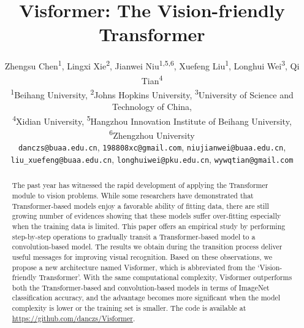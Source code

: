 \documentclass[10pt,twocolumn,letterpaper]{article}
\begin{document}
\title{Visformer: The Vision-friendly Transformer}

\author{Zhengsu Chen\textsuperscript{1}, Lingxi Xie\textsuperscript{2}, Jianwei Niu\textsuperscript{1,5,6}, Xuefeng Liu\textsuperscript{1}, Longhui Wei\textsuperscript{3}, Qi Tian\textsuperscript{4}\\
\textsuperscript{1}Beihang University, \textsuperscript{2}Johns Hopkins University, \textsuperscript{3}University of Science and Technology of China,\\ 
\textsuperscript{4}Xidian University,
\textsuperscript{5}Hangzhou Innovation Institute of Beihang University, 
\textsuperscript{6}Zhengzhou University\\
{\tt\small danczs@buaa.edu.cn}, {\tt\small 198808xc@gmail.com}, {\tt\small niujianwei@buaa.edu.cn},\\
{\tt\small liu\_xuefeng@buaa.edu.cn}, {\tt\small longhuiwei@pku.edu.cn}, {\tt\small  wywqtian@gmail.com}
}





\maketitle
\ificcvfinal\thispagestyle{empty}\fi

\begin{abstract}


The past year has witnessed the rapid development of applying the Transformer module to vision problems. While some researchers have demonstrated that Transformer-based models enjoy a favorable ability of fitting data, there are still growing number of evidences showing that these models suffer over-fitting especially when the training data is limited. This paper offers an empirical study by performing step-by-step operations to gradually transit a Transformer-based model to a convolution-based model. The results we obtain during the transition process deliver useful messages for improving visual recognition. Based on these observations, we propose a new architecture named Visformer, which is abbreviated from the `Vision-friendly Transformer'. With the same computational complexity, Visformer outperforms both the Transformer-based and convolution-based models in terms of ImageNet classification accuracy, and the advantage becomes more significant when the model complexity is lower or the training set is smaller. The code is available at \url{https://github.com/danczs/Visformer}.
\end{abstract}
\end{document}
